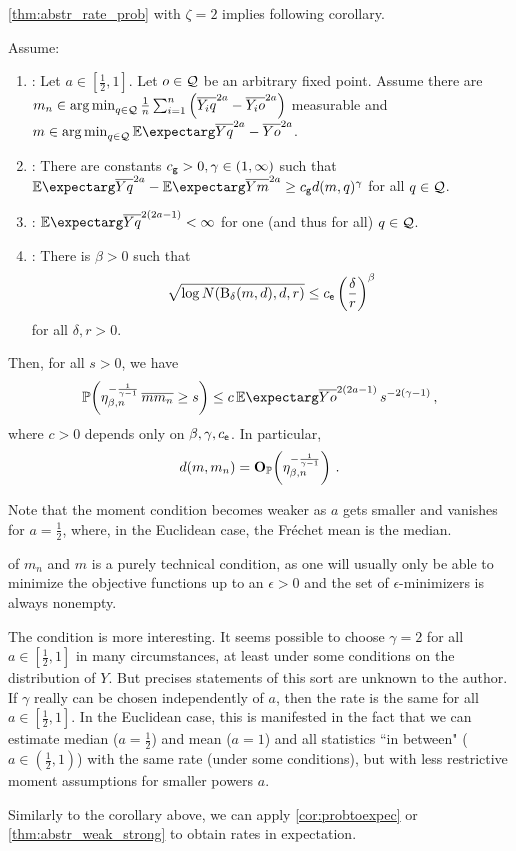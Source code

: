 \autoref{thm:abstr_rate_prob} with $\zeta=2$ implies following corollary.
%
\begin{corollary}\label{coro:probrates_power}
	Assume:
	\begin{enumerate}[label=\environmentEnumerateLabel]
	\item
		:	Let $a\in[\frac12,1]$. Let $o\in\mathcal{Q}$ be an arbitrary fixed point. Assume there are $m_n\in\operatorname*{arg\,min}_{q\in\mathcal{Q}} \frac1n\sum_{i=1}^n \left( \overline{Y_iq}^{2a}-\overline{Y_io}^{2a} \right)$ measurable and $m\in\argmin_{q\in\mc Q} \Ex{\ol Yq^{2a}-\ol Yo^{2a}}$.
	\item 
		: There are constants $c_{\mathsf{g}} > 0, \gamma\in(1,\infty)$ such that 
				$\Ex{\ol Yq^{2a}}-\Ex{\ol Ym^{2a}}  \geq c_{\ms g} d(m,q)^\gamma$ for all $q\in\mathcal{Q}$.
	\item {}:   $\Ex{\ol{Y}{q}^{2(2a-1)}} < \infty$ for one (and thus for all) $q\in\mathcal{Q}$.
	\item {}: 
		There is $\beta > 0$ such that
		\begin{equation*}
			\sqrt{\log N(\operatorname{\mathrm{B}}_\delta(m, d), d, r)} \leq c_{\mathsf{e}} \left( \frac{\delta}{r} \right)^\beta
		\end{equation*}
		for all $\delta, r > 0$.
	\end{enumerate}
	Then, for all $s > 0$, we have
	\begin{equation*}
		\PrOf{\eta_{\beta,n}^{-\frac1{\gamma-1}}\, \ol{m}{m_n} \geq s} \leq c \,\Ex{\ol{Y}{o}^{2(2a-1)}} \, s^{-2(\gamma-1)}
		\eqcm
	\end{equation*}
	where $c > 0$ depends only on $\beta, \gamma, c_{\mathsf{e}}$.
	In particular,
	\begin{equation*}
		d(m, m_n) = \mathbf{O}_{\mathbb{P}}\!\left( \eta_{\beta,n}^{-\frac1{\gamma-1}} \right)
		\, .
	\end{equation*}
\end{corollary}
%
Note that the moment condition becomes weaker as $a$ gets smaller and vanishes for $a=\frac12$, where, in the Euclidean case, the Fréchet mean is the median. 

 of $m_n$ and $m$ is a purely technical condition, as one will usually only be able to minimize the objective functions up to an $\epsilon>0$ and the set of $\epsilon$-minimizers is always nonempty.

The  condition is more interesting. It seems possible to choose $\gamma=2$ for all $a\in[\frac12,1]$ in many circumstances, at least under some conditions on the distribution of $Y$. But precises statements of this sort are unknown to the author. If $\gamma$ really can be chosen independently of $a$, then the rate is the same for all $a\in[\frac12,1]$. In the Euclidean case, this is manifested in the fact that we can estimate median ($a = \frac12$) and mean ($a = 1$) and all statistics ``in between" ($a \in (\frac12,1)$) with the same rate (under some conditions), but with less restrictive moment assumptions for smaller powers $a$.

Similarly to the corollary above, we can apply \autoref{cor:probtoexpec} or \autoref{thm:abstr_weak_strong} to obtain rates in expectation.
%
%
%
%
%